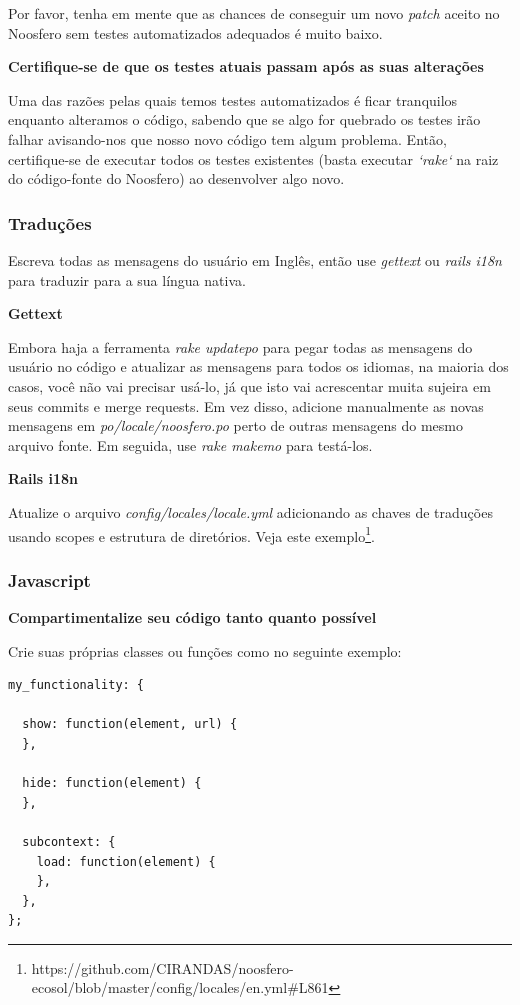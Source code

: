 \documentclass[11pt]{article}
\begin{document}
Por favor, tenha em mente que as chances de conseguir um novo {\it patch}
aceito no Noosfero sem testes automatizados adequados é muito baixo.

{\bf Certifique-se de que os testes atuais passam após as suas alterações}

Uma das razões pelas quais temos testes automatizados é ficar tranquilos
enquanto alteramos o código, sabendo que se algo for quebrado os testes irão
falhar avisando-nos que nosso novo código tem algum problema. Então,
certifique-se de executar todos os testes existentes (basta executar
{\it `rake`} na raiz do código-fonte do Noosfero) ao desenvolver algo novo.

\subsubsection{Traduções}

Escreva todas as mensagens do usuário em Inglês, então use {\it gettext} ou
{\it rails i18n} para traduzir para a sua língua nativa.

{\bf Gettext}

Embora haja a ferramenta {\it rake updatepo} para pegar todas as mensagens do
usuário no código e atualizar as mensagens para todos os idiomas, na maioria
dos casos, você não vai precisar usá-lo, já que isto vai acrescentar muita
sujeira em seus commits e merge requests. Em vez disso, adicione manualmente
as novas mensagens em {\it po/locale/noosfero.po} perto de outras mensagens do mesmo
arquivo fonte. Em seguida, use {\it rake makemo} para testá-los.

{\bf Rails i18n}

Atualize o arquivo {\it config/locales/locale.yml} adicionando as chaves de
traduções usando scopes e estrutura de diretórios. Veja este
exemplo\footnote{https://github.com/CIRANDAS/noosfero-ecosol/blob/master/config/locales/en.yml\#L861}.

\subsubsection{Javascript}

{\bf Compartimentalize seu código tanto quanto possível}

Crie suas próprias classes ou funções como no seguinte exemplo:

\begin{Verbatim}[frame=single,fontfamily=courier]
my_functionality: {
 
  show: function(element, url) {
  },
 
  hide: function(element) {
  },
 
  subcontext: {
    load: function(element) {
    },    
  },
};
\end{Verbatim}
\end{document}
